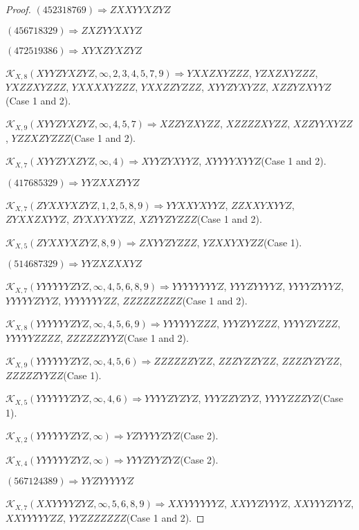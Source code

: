 \documentclass[12pt]{article}
\theoremstyle{plain}
\theoremstyle{definition}
\theoremstyle{remark}
\newcommand{\fancy}[1]{\mathcal{#1}}
\def\K{\fancy{K}}
\begin{document}
\begin{proof}
	$(4 5 2 3 1 8 7 6 9)\Rightarrow ZXXYYXZYZ$
	
	$(4 5 6 7 1 8 3 2 9)\Rightarrow ZXZYYXXYZ$
	
	$(4 7 2 5 1 9 3 8 6)\Rightarrow XYXZYXZYZ$
	
	
	
	$\K_{X,8}(XYYZYXZYZ,\infty,2, 3, 4, 5, 7, 9)\Rightarrow $$YXXZXYZZZ$, $YZXZXYZZZ$, $YXZZXYZZZ$, $YXXXXYZZZ$, $YXXZZYZZZ$, $XYYZYXYZZ$, $XZZYZXYYZ$(Case 1 and 2).
	
	$\K_{X,9}(XYYZYXZYZ,\infty,4, 5, 7)\Rightarrow $$XZZYZXYZZ$, $XZZZZXYZZ$, $XZZYYXYZZ$, $YZZXZYZZZ$(Case 1 and 2).
	
	$\K_{X,7}(XYYZYXZYZ,\infty,4)\Rightarrow $$XYYZYXYYZ$, $XYYYYXYYZ$(Case 1 and 2).
	
	
	
	$(4 1 7 6 8 5 3 2 9)\Rightarrow YYZXXZYYZ$
	
	
	
	$\K_{X,7}(ZYXXYXZYZ,1, 2, 5, 8, 9)\Rightarrow $$YYXXYXYYZ$, $ZZXXYXYYZ$, $ZYXXZXYYZ$, $ZYXXYXYZZ$, $XZYYZYZZZ$(Case 1 and 2).
	
	$\K_{X,5}(ZYXXYXZYZ,8, 9)\Rightarrow $$ZXYYZYZZZ$, $YZXXYXYZZ$(Case 1).
	
	
	
	$(5 1 4 6 8 7 3 2 9)\Rightarrow YYZXZXXYZ$
	
	
	
	$\K_{X,7}(YYYYYYZYZ,\infty,4, 5, 6, 8, 9)\Rightarrow $$YYYYYYYYZ$, $YYYZYYYYZ$, $YYYYZYYYZ$, $YYYYYZYYZ$, $YYYYYYYZZ$, $ZZZZZZZZZ$(Case 1 and 2).
	
	$\K_{X,8}(YYYYYYZYZ,\infty,4, 5, 6, 9)\Rightarrow $$YYYYYYZZZ$, $YYYZYYZZZ$, $YYYYZYZZZ$, $YYYYYZZZZ$, $ZZZZZZYYZ$(Case 1 and 2).
	
	$\K_{X,9}(YYYYYYZYZ,\infty,4, 5, 6)\Rightarrow $$ZZZZZZYZZ$, $ZZZYZZYZZ$, $ZZZZYZYZZ$, $ZZZZZYYZZ$(Case 1).
	
	$\K_{X,5}(YYYYYYZYZ,\infty,4, 6)\Rightarrow $$YYYYZYZYZ$, $YYYZZYZYZ$, $YYYYZZZYZ$(Case 1).
	
	$\K_{X,2}(YYYYYYZYZ,\infty)\Rightarrow $$YZYYYYZYZ$(Case 2).
	
	$\K_{X,4}(YYYYYYZYZ,\infty)\Rightarrow $$YYYZYYZYZ$(Case 2).
	
	
	
	$(5 6 7 1 2 4 3 8 9)\Rightarrow YYZYYYYYZ$
	
	
	
	$\K_{X,7}(XXYYYYZYZ,\infty,5, 6, 8, 9)\Rightarrow $$XXYYYYYYZ$, $XXYYZYYYZ$, $XXYYYZYYZ$, $XXYYYYYZZ$, $YYZZZZZZZ$(Case 1 and 2).
	

\end{proof}
\end{document}
